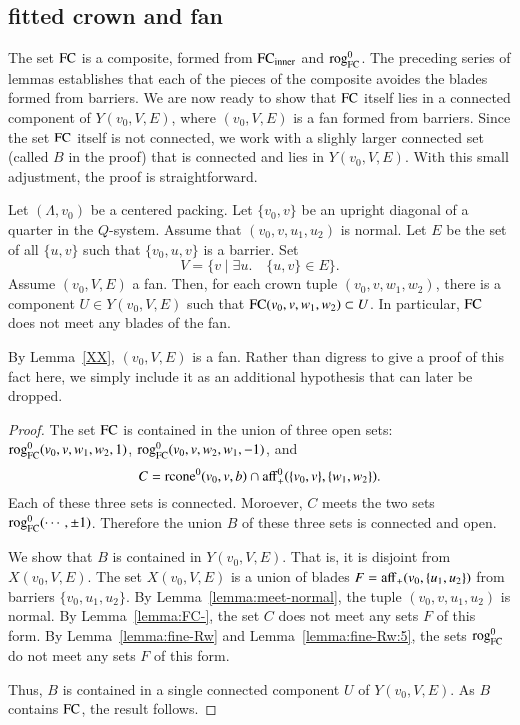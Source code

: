 \subsection{fitted crown and fan}

The set ${\operatorname{FC}}$ is a composite, formed from ${\operatorname{FC}}_{\text{inner}}$ and ${\operatorname{rog}}^0_{\text{FC}}$.  The
preceding series of lemmas establishes that each of the pieces of the composite
avoides the blades formed from barriers.  We are now ready to show that ${\operatorname{FC}}$
itself lies in a connected component of $Y(v_0,V,E)$, where $(v_0,V,E)$ is a
fan formed from barriers.  Since the set ${\operatorname{FC}}$ itself is not connected, we
work with a slighly larger connected set (called $B$ in the proof) that is connected
and lies in $Y(v_0,V,E)$.  With this small adjustment, the proof is
straightforward.


\begin{lemma}
Let $(\Lambda,v_0)$ be a centered packing.
Let $\{v_0,v\}$ be
an upright diagonal of a quarter in the $Q$-system.
Assume that $(v_0,v,u_1,u_2)$ is normal.
Let $E$ be the set of all $\{u,v\}$ such that $\{v_0,u,v\}$
is a barrier.  Set
   $$
   V = \{v \mid \exists u.\quad \{u,v\}\in E\}.
   $$
Assume $(v_0,V,E)$ a fan.  Then, for each crown tuple
$(v_0,v,w_1,w_2)$, there is a component $U\in Y(v_0,V,E)$ such
that ${\operatorname{FC}}(v_0,v,w_1,w_2)\subset U$.  In particular, ${\operatorname{FC}}$ does
not meet any blades of the fan.
\end{lemma}

By Lemma~\ref{XX},  $(v_0,V,E)$ is a fan.  
Rather than digress to give
a proof of this fact here, we simply include it as an additional hypothesis that
can later be dropped.

\begin{proof}
The set ${\operatorname{FC}}$ is contained in the union of three open sets:
${\operatorname{rog}}^0_{\text{FC}}(v_0,v,w_1,w_2,1)$, ${\operatorname{rog}}^0_{\text{FC}}(v_0,v,w_2,w_1,-1)$, and
  $$
  C={\operatorname{rcone}}^0(v_0,v,b)\cap {\operatorname{aff}}_+^0(\{v_0,v\},\{w_1,w_2\}).
  $$
Each of these three sets is connected.  Moroever, $C$ meets
the two sets  ${\operatorname{rog}}^0_{\text{FC}}(\cdots,\pm1)$.  Therefore the union $B$ of
these three sets is connected and open.  

We show that $B$ is contained in $Y(v_0,V,E)$.  That is,
it is disjoint from $X(v_0,V,E)$.
The set $X(v_0,V,E)$ is a union of blades $F={\operatorname{aff}}_+(v_0,\{u_1,u_2\})$
from barriers $\{v_0,u_1,u_2\}$.  By Lemma~\ref{lemma:meet-normal},
the tuple $(v_0,v,u_1,u_2)$ is normal.
By Lemma~\ref{lemma:FC-}, the set $C$ does not meet any sets $F$
of this form.  By Lemma~\ref{lemma:fine-Rw} and Lemma~\ref{lemma:fine-Rw:5}, the sets ${\operatorname{rog}}^0_{\text{FC}}$ do not meet any sets $F$ of this form.

Thus, $B$ is contained in a single connected component $U$ of $Y(v_0,V,E)$.  As $B$ contains ${\operatorname{FC}}$, the result follows.
\end{proof}


